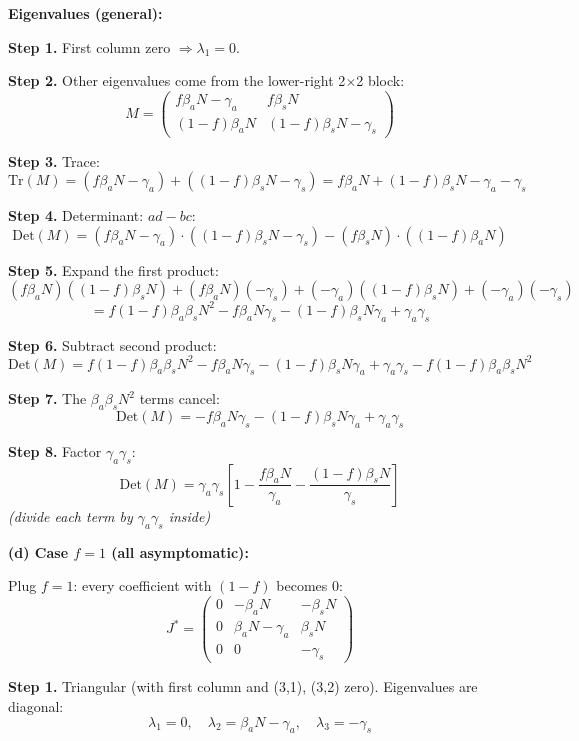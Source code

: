 \documentclass[10pt]{article}
\newcommand{\stepwhy}[1]{\textcolor{blue!60!black}{\small\textit{(#1)}}}
\begin{document}
\begin{solution}
\medskip\textbf{Eigenvalues (general):}

\textbf{Step 1.} First column zero $\Rightarrow \lambda_1 = 0$.

\textbf{Step 2.} Other eigenvalues come from the lower-right 2$\times$2 block:
\[
M = \begin{pmatrix} f\beta_a N - \gamma_a & f\beta_s N \\ (1-f)\beta_a N & (1-f)\beta_s N - \gamma_s \end{pmatrix}
\]

\textbf{Step 3.} Trace:
\[
\text{Tr}(M) = (f\beta_a N - \gamma_a) + ((1-f)\beta_s N - \gamma_s) = f\beta_a N + (1-f)\beta_s N - \gamma_a - \gamma_s
\]

\textbf{Step 4.} Determinant: $ad - bc$:
\[
\text{Det}(M) = (f\beta_a N - \gamma_a)\cdot((1-f)\beta_s N - \gamma_s) - (f\beta_s N)\cdot((1-f)\beta_a N)
\]

\textbf{Step 5.} Expand the first product:
\[
(f\beta_a N)((1-f)\beta_s N) + (f\beta_a N)(-\gamma_s) + (-\gamma_a)((1-f)\beta_s N) + (-\gamma_a)(-\gamma_s)
\]
\[
= f(1-f)\beta_a\beta_s N^2 - f\beta_a N\gamma_s - (1-f)\beta_s N\gamma_a + \gamma_a\gamma_s
\]

\textbf{Step 6.} Subtract second product:
\[
\text{Det}(M) = f(1-f)\beta_a\beta_s N^2 - f\beta_a N\gamma_s - (1-f)\beta_s N\gamma_a + \gamma_a\gamma_s - f(1-f)\beta_a\beta_s N^2
\]

\textbf{Step 7.} The $\beta_a\beta_s N^2$ terms cancel:
\[
\text{Det}(M) = -f\beta_a N\gamma_s - (1-f)\beta_s N\gamma_a + \gamma_a\gamma_s
\]

\textbf{Step 8.} Factor $\gamma_a\gamma_s$:
\[
\text{Det}(M) = \gamma_a\gamma_s\left[1 - \frac{f\beta_a N}{\gamma_a} - \frac{(1-f)\beta_s N}{\gamma_s}\right]
\]
\stepwhy{divide each term by $\gamma_a\gamma_s$ inside}

\medskip\textbf{(d) Case $f = 1$ (all asymptomatic):}

Plug $f = 1$: every coefficient with $(1-f)$ becomes 0:
\[
J^* = \begin{pmatrix} 0 & -\beta_a N & -\beta_s N \\ 0 & \beta_a N - \gamma_a & \beta_s N \\ 0 & 0 & -\gamma_s \end{pmatrix}
\]

\textbf{Step 1.} Triangular (with first column and (3,1), (3,2) zero). Eigenvalues are diagonal:
\[
\lambda_1 = 0, \quad \lambda_2 = \beta_a N - \gamma_a, \quad \lambda_3 = -\gamma_s
\]


\end{solution}
\end{document}
